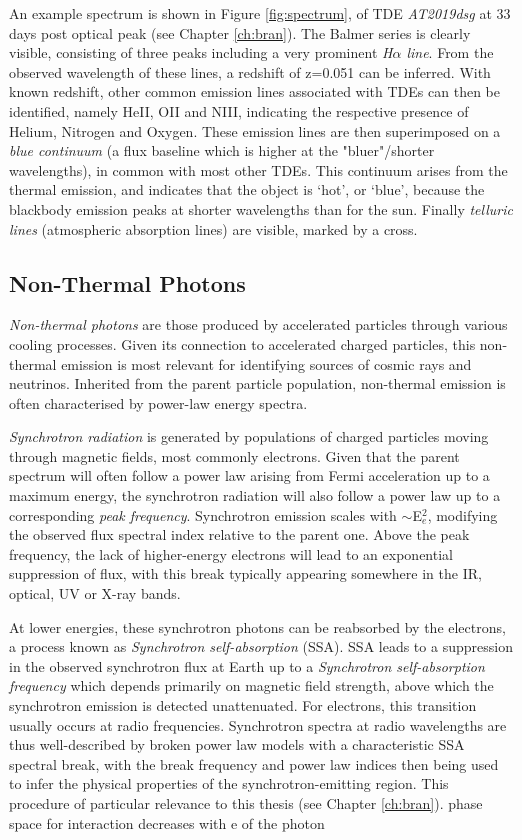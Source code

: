 An example spectrum is shown in Figure \ref{fig:spectrum}, of TDE \emph{AT2019dsg} at 33 days post optical peak (see Chapter \ref{ch:bran}). The Balmer series is clearly visible, consisting of three peaks including a very prominent \emph{H$\alpha$ line}. From the observed wavelength of these lines, a redshift of z=0.051 can be inferred. With known redshift, other common emission lines associated with TDEs can then be identified, namely HeII, OII and NIII, indicating the respective presence of Helium, Nitrogen and Oxygen. These emission lines are then superimposed on a \emph{blue continuum} (a flux baseline which is higher at the "bluer"/shorter wavelengths), in common with most other TDEs. This continuum arises from the thermal emission, and indicates that the object is `hot', or `blue', because the blackbody emission peaks at shorter wavelengths than for the sun. Finally \emph{telluric lines} (atmospheric absorption lines) are visible, marked by a cross. 

 \subsection*{Non-Thermal Photons}
 
\emph{Non-thermal photons} are those produced by accelerated particles through various cooling processes. Given its connection to accelerated charged particles, this non-thermal emission is most relevant for identifying sources of cosmic rays and neutrinos. Inherited from the parent particle population, non-thermal emission is often characterised by power-law energy spectra.

\emph{Synchrotron radiation} is generated by populations of charged particles moving through magnetic fields, most commonly electrons. Given that the parent spectrum will often follow a power law arising from Fermi acceleration up to a maximum energy, the synchrotron radiation will also follow a power law up to a corresponding \emph{peak frequency}. Synchrotron emission scales with $\sim$E$_{e}^{2}$, modifying the observed flux spectral index relative to the parent one. Above the peak frequency, the lack of higher-energy electrons will lead to an exponential suppression of flux, with this break typically appearing somewhere in the IR, optical, UV or X-ray bands.

At lower energies, these synchrotron photons can be reabsorbed by the electrons, a process known as \emph{Synchrotron self-absorption} (SSA). SSA leads to a suppression in the observed synchrotron flux at Earth up to a \emph{Synchrotron self-absorption frequency} which depends primarily on magnetic field strength, above which the synchrotron emission is detected unattenuated. For electrons, this transition usually occurs at radio frequencies. Synchrotron spectra at radio wavelengths are thus well-described by broken power law models with a characteristic SSA spectral break, with the break frequency and power law indices then being used to infer the physical properties of the synchrotron-emitting region.  This procedure of particular relevance to this thesis (see Chapter \ref{ch:bran}).  phase space for interaction decreases with e of the photon

